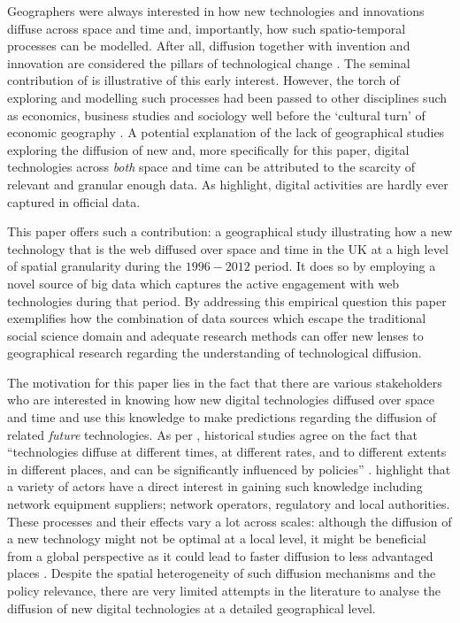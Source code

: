 \documentclass[
  authoryear,
  preprint,
  3p]{elsarticle}
\begin{document}
Geographers were always interested in how new technologies and
innovations diffuse across space and time and, importantly, how such
spatio-temporal processes can be modelled. After all, diffusion together
with invention and innovation are considered the pillars of
technological change \citep{das2022diffusion}. The seminal contribution
of \citet{hagerstrand1968innovation} is illustrative of this early
interest. However, the torch of exploring and modelling such processes
had been passed to other disciplines such as economics, business studies
and sociology well before the `cultural turn' of economic geography
\citep{perkins2005international}. A potential explanation of the lack of
geographical studies exploring the diffusion of new and, more
specifically for this paper, digital technologies across \emph{both}
space and time can be attributed to the scarcity of relevant and
granular enough data. As \citet{zook2022mapping} highlight, digital
activities are hardly ever captured in official data.

This paper offers such a contribution: a geographical study illustrating
how a new technology that is the web diffused over space and time in the
UK at a high level of spatial granularity during the \(1996-2012\)
period. It does so by employing a novel source of big data which
captures the active engagement with web technologies during that period.
By addressing this empirical question this paper exemplifies how the
combination of data sources which escape the traditional social science
domain and adequate research methods can offer new lenses to
geographical research regarding the understanding of technological
diffusion.

The motivation for this paper lies in the fact that there are various
stakeholders who are interested in knowing how new digital technologies
diffused over space and time and use this knowledge to make predictions
regarding the diffusion of related \emph{future} technologies. As per
\citet{leibowicz2016representing}, historical studies agree on the fact
that ``technologies diffuse at different times, at different rates, and
to different extents in different places, and can be significantly
influenced by policies'' \citep{victor1993}. \citet{meade2021modelling}
highlight that a variety of actors have a direct interest in gaining
such knowledge including network equipment suppliers; network operators,
regulatory and local authorities. These processes and their effects vary
a lot across scales: although the diffusion of a new technology might
not be optimal at a local level, it might be beneficial from a global
perspective as it could lead to faster diffusion to less advantaged
places \citep{leibowicz2016representing}. Despite the spatial
heterogeneity of such diffusion mechanisms and the policy relevance,
there are very limited attempts in the literature to analyse the
diffusion of new digital technologies at a detailed geographical level.
\end{document}
